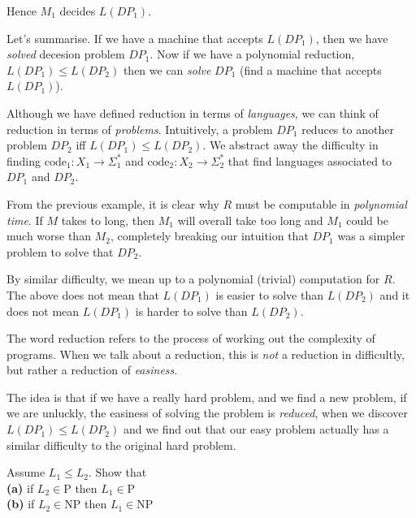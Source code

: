 Hence $M_1$ decides $L(DP_1)$.



\frmrule

Let's summarise. 
If we have a machine that accepts $L(DP_1)$, 
then we have \textit{solved} decesion problem $DP_1$. 
Now if we have a polynomial 
reduction, $L(DP_1) \leqslant L(DP_2)$ then we can \textit{solve} $DP_1$ 
(find a machine that accepts $L(DP_1)$). 

Although we have defined reduction in terms of \textit{languages},
we can think of reduction in terms of \textit{problems}. 
Intuitively, a problem $DP_1$ reduces to another problem $DP_2$ iff 
$L(DP_1) \leqslant L(DP_2)$. We abstract away the difficulty in finding 
$\text{code}_1:X_1 \rightarrow \Sigma^{*}_1$ and 
$\text{code}_2:X_2 \rightarrow \Sigma^{*}_2$ that 
find languages associated to $DP_1$ and $DP_2$. 


From the previous example, it is clear why $R$ 
must be computable in \textit{polynomial time}. 
If $M$ takes to long, then $M_1$ will overall take too long and 
$M_1$ could be much worse than $M_2$, completely breaking our intuition 
that $DP_1$ was a simpler problem to solve that $DP_2$.


By similar difficulty, we mean up to a polynomial 
(trivial) computation for $R$. The above does not mean 
that $L(DP_1)$ is easier to solve 
than $L(DP_2)$ and it does not mean $L(DP_1)$ is harder 
to solve than $L(DP_2)$.

The word reduction refers to the process of working out the complexity 
of programs. When we talk about a reduction, this is \textit{not} a reduction 
in difficultly, but rather a reduction of \textit{easiness}.

The idea is that if we have a really hard problem, and we find a new 
problem, if we are unluckly, the easiness of solving the problem 
is \textit{reduced}, when we discover $L(DP_1) \leqslant L(DP_2)$
and we find out that our easy problem actually has a similar difficulty 
to the original hard problem. 


\frmrule

\begin{example}
Assume $L_1 \leqslant L_2$. Show that \\
\textbf{(a)} if $L_2 \in \text{P}$ then $L_1 \in \text{P}$ \\
\textbf{(b)} if $L_2 \in \text{NP}$ then $L_1 \in \text{NP}$
\end{example}

